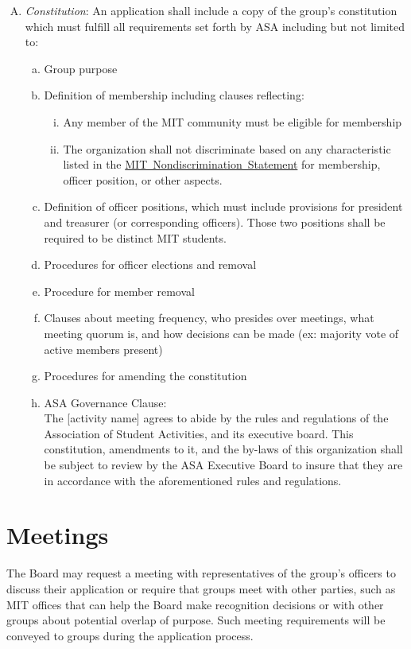 \documentclass[12pt]{article}
\newcommand{\NDS}{\href{https://handbook.mit.edu/nondiscrimination}{MIT~Nondiscrimination~Statement}\xspace}
\begin{document}
\begin{enumerate}[A.]
    \item \textit{Constitution}: An application shall include a copy of the group’s constitution which must fulfill
all requirements set forth by ASA including but not limited to:
    \begin{enumerate}[a.]
        \item Group purpose
        \item Definition of membership including clauses reflecting:
        \begin{enumerate}[i.]
            \item Any member of the MIT community must be eligible for membership
            \item The organization shall not discriminate based on any characteristic listed in the
            \NDS for membership, officer position, or other
aspects.
        \end{enumerate}
    \item Definition of officer positions, which must include provisions for president and
treasurer (or corresponding officers). Those two positions shall be required to be
distinct MIT students.
    \item Procedures for officer elections and removal
    \item Procedure for member removal
    \item Clauses about meeting frequency, who presides over meetings, what meeting quorum is,
and how decisions can be made (ex: majority vote of active members present)
    \item Procedures for amending the constitution
    \item ASA Governance Clause:\\

The [activity name] agrees to abide by the rules and regulations of the Association of
Student Activities, and its executive board. This constitution, amendments to it, and the
by-laws of this organization shall be subject to review by the ASA Executive Board to insure
that they are in accordance with the aforementioned rules and regulations.
    \end{enumerate}
\end{enumerate}

\section{Meetings}
The Board may request a meeting with representatives of the group’s officers to discuss their
application or require that groups meet with other parties, such as MIT offices that can help the
Board make recognition decisions or with other groups about potential overlap of purpose. Such
meeting requirements will be conveyed to groups during the application process.
\end{document}

